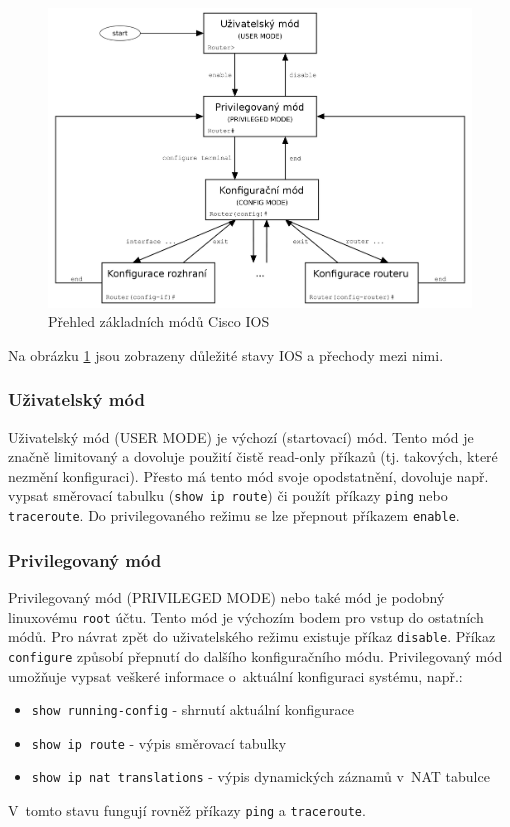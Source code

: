 \begin{figure}[h]
\begin{center}
\includegraphics[width=13cm]{figures/ios.png}
\caption{Přehled základních módů Cisco IOS \cite{wiki:ios}}
\label{fig:ios}
\end{center}
\end{figure}

Na obrázku \ref{fig:ios} jsou zobrazeny důležité stavy IOS a přechody mezi nimi. 


\subsubsection{Uživatelský mód}
Uživatelský mód (USER MODE) je výchozí (startovací) mód. Tento mód je značně limitovaný a dovoluje použití čistě read-only příkazů (tj. takových, které nezmění konfiguraci). Přesto má tento mód svoje opodstatnění, dovoluje např. vypsat směrovací tabulku (\verb|show ip route|) či použít příkazy \verb|ping| nebo \verb|traceroute|. Do privilegovaného režimu se lze přepnout příkazem \verb|enable|.

\subsubsection{Privilegovaný mód}
Privilegovaný mód (PRIVILEGED MODE) nebo také  mód je podobný linuxovému \verb|root| účtu. Tento mód je výchozím bodem pro vstup do ostatních módů. Pro návrat zpět do uživatelského režimu existuje příkaz \verb|disable|. Příkaz \verb|configure| způsobí přepnutí do dalšího konfiguračního módu. Privilegovaný mód umožňuje vypsat veškeré informace o~aktuální konfiguraci systému, např.:
\begin{itemize}
 \item \verb|show running-config| - shrnutí aktuální konfigurace
 \item \verb|show ip route| - výpis směrovací tabulky
 \item \verb|show ip nat translations| - výpis dynamických záznamů v~NAT tabulce
\end{itemize}
V~tomto stavu fungují rovněž příkazy \verb|ping| a \verb|traceroute|.

